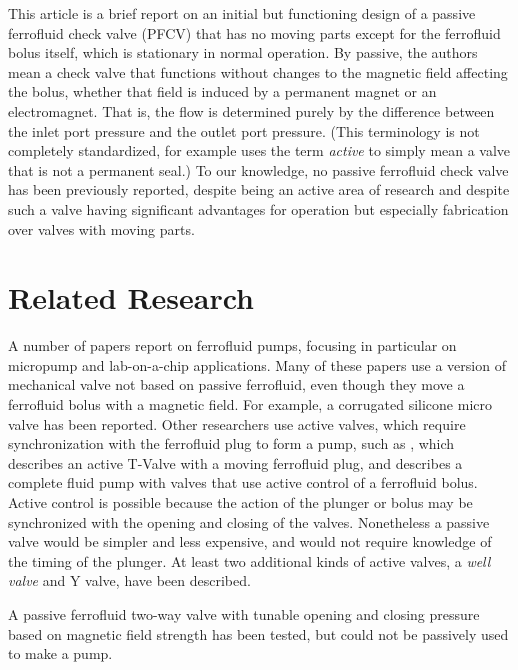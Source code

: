 \documentclass[twocolumn,10pt]{asme2ej}
\begin{document}
This article is a brief report on an initial but functioning design of a
passive ferrofluid check valve (PFCV) that has no moving
parts except for the ferrofluid bolus itself, which is stationary
in normal operation.
By passive, the authors
mean a check valve that functions without changes to the magnetic
field affecting the bolus, whether that field is induced by a
permanent magnet or an electromagnet.
That is, the flow is determined
purely by the difference between the inlet port pressure and the
outlet port pressure.
(This terminology is not completely standardized,
for example \cite{hartshorne2004ferrofluid} uses the
term {\em active} to simply mean a valve that is not a permanent seal.)
To our knowledge, no passive
ferrofluid check valve has been previously reported, despite being an
active area of research and despite such a valve having
significant advantages for operation but especially
fabrication over valves with moving parts.

\section{Related Research}

A number of papers report on ferrofluid pumps, focusing in particular
on micropump and lab-on-a-chip applications\cite{ozbey2015modeling,hsu2018biocompatible}.
Many of these papers use
a version of mechanical valve not based on passive
ferrofluid, even though they move a ferrofluid bolus
with a magnetic field.
For example,
a corrugated silicone micro valve\cite{yamahata2003ferrofluid,yamahata2005plastic}
has been reported.
Other researchers use active valves, which require synchronization with
the ferrofluid plug to form a pump,
such as \cite{menz2000fluidic}, which
describes an active T-Valve with a moving ferrofluid plug, and
\cite{ando2009ferrofluidic} describes a complete fluid pump with valves
that use
active control of a ferrofluid bolus.
Active control is possible because the
action of the plunger or bolus may be synchronized with the opening and closing
of the valves.
Nonetheless a passive valve would be simpler and less
expensive, and would not require knowledge of the timing of the
plunger.
At least two additional kinds of active valves, a {\em well valve} and Y valve, have
been described\cite{hartshorne2004ferrofluid}.

A passive ferrofluid two-way valve with tunable
opening and closing pressure based on magnetic
field strength\cite{paschalis2013novel} has been tested,
but could not be passively used to make a pump.
\end{document}
